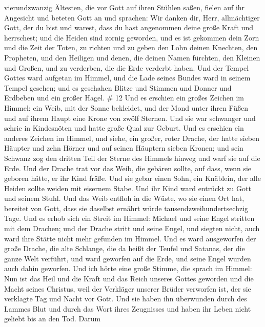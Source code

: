vierundzwanzig Ältesten, die vor Gott auf ihren Stühlen saßen, fielen
auf ihr Angesicht und beteten Gott an  und sprachen: Wir
danken dir, Herr, allmächtiger Gott, der du bist und warest, dass du
hast angenommen deine große Kraft und herrschest;  und die
Heiden sind zornig geworden, und es ist gekommen dein Zorn und die Zeit
der Toten, zu richten und zu geben den Lohn deinen Knechten, den
Propheten, und den Heiligen und denen, die deinen Namen fürchten, den
Kleinen und Großen, und zu verderben, die die Erde verderbt haben.
 Und der Tempel Gottes ward aufgetan im Himmel, und die
Lade seines Bundes ward in seinem Tempel gesehen; und es geschahen
Blitze und Stimmen und Donner und Erdbeben und ein großer Hagel. \# 12
 Und es erschien ein großes Zeichen im Himmel: ein Weib, mit
der Sonne bekleidet, und der Mond unter ihren Füßen und auf ihrem Haupt
eine Krone von zwölf Sternen.  Und sie war schwanger und
schrie in Kindesnöten und hatte große Qual zur Geburt.  Und
es erschien ein anderes Zeichen im Himmel, und siehe, ein großer, roter
Drache, der hatte sieben Häupter und zehn Hörner und auf seinen Häuptern
sieben Kronen;  und sein Schwanz zog den dritten Teil der
Sterne des Himmels hinweg und warf sie auf die Erde. Und der Drache trat
vor das Weib, die gebären sollte, auf dass, wenn sie geboren hätte, er
ihr Kind fräße.  Und sie gebar einen Sohn, ein Knäblein, der
alle Heiden sollte weiden mit eisernem Stabe. Und ihr Kind ward entrückt
zu Gott und seinem Stuhl.  Und das Weib entfloh in die
Wüste, wo sie einen Ort hat, bereitet von Gott, dass sie daselbst
ernährt würde tausendzweihundertsechzig Tage.  Und es erhob
sich ein Streit im Himmel: Michael und seine Engel stritten mit dem
Drachen; und der Drache stritt und seine Engel,  und siegten
nicht, auch ward ihre Stätte nicht mehr gefunden im Himmel. 
Und es ward ausgeworfen der große Drache, die alte Schlange, die da
heißt der Teufel und Satanas, der die ganze Welt verführt, und ward
geworfen auf die Erde, und seine Engel wurden auch dahin geworfen.
 Und ich hörte eine große Stimme, die sprach im Himmel: Nun
ist das Heil und die Kraft und das Reich unseres Gottes geworden und die
Macht seines Christus, weil der Verkläger unserer Brüder verworfen ist,
der sie verklagte Tag und Nacht vor Gott.  Und sie haben
ihn überwunden durch des Lammes Blut und durch das Wort ihres Zeugnisses
und haben ihr Leben nicht geliebt bis an den Tod.  Darum
